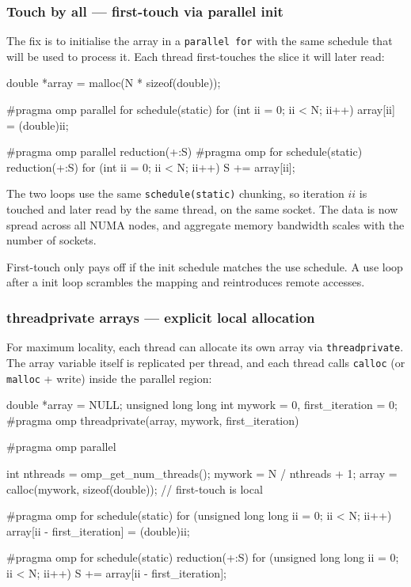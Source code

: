 \subsubsection{Touch by all --- first-touch via parallel init}

The fix is to initialise the array in a \texttt{parallel for} with the same schedule that will be used to process it. Each thread first-touches the slice it will later read:

\begin{codeblock}[language = C, morekeywords={pragma}]
double *array = malloc(N * sizeof(double));

#pragma omp parallel for schedule(static)
for (int ii = 0; ii < N; ii++)
    array[ii] = (double)ii;

#pragma omp parallel reduction(+:S)
{
    #pragma omp for schedule(static) reduction(+:S)
    for (int ii = 0; ii < N; ii++)
        S += array[ii];
}
\end{codeblock}

The two loops use the same \texttt{schedule(static)} chunking, so iteration $ii$ is touched and later read by the same thread, on the same socket. The data is now spread across all NUMA nodes, and aggregate memory bandwidth scales with the number of sockets.

\begin{warningblock}
First-touch only pays off if the init schedule matches the use schedule. A  use loop after a  init loop scrambles the mapping and reintroduces remote accesses.
\end{warningblock}

\subsubsection{threadprivate arrays --- explicit local allocation}

For maximum locality, each thread can allocate its own array via \texttt{threadprivate}. The array variable itself is replicated per thread, and each thread calls \texttt{calloc} (or \texttt{malloc} + write) inside the parallel region:

\begin{codeblock}[language = C, morekeywords={pragma}]
double                 *array  = NULL;
unsigned long long int  mywork = 0, first_iteration = 0;
#pragma omp threadprivate(array, mywork, first_iteration)

#pragma omp parallel
{
    int nthreads = omp_get_num_threads();
    mywork = N / nthreads + 1;
    array  = calloc(mywork, sizeof(double));   // first-touch is local

    #pragma omp for schedule(static)
    for (unsigned long long ii = 0; ii < N; ii++)
        array[ii - first_iteration] = (double)ii;

    #pragma omp for schedule(static) reduction(+:S)
    for (unsigned long long ii = 0; ii < N; ii++)
        S += array[ii - first_iteration];
}
\end{codeblock}

